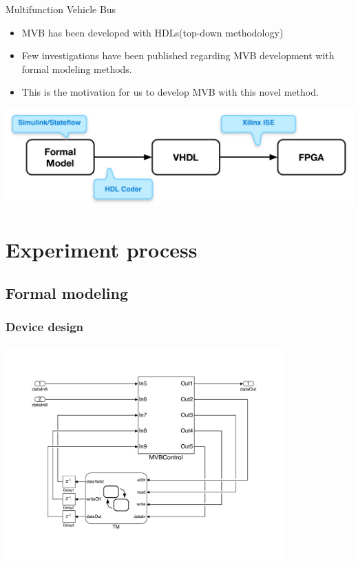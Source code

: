 \documentclass[12pt,beamer]{beamer}
\begin{document}
\begin{frame}{Multifunction Vehicle Bus}

\begin{itemize}
	\setlength{\itemsep}{10pt}
	\item MVB has been developed with HDLs(top-down methodology)
	\item Few investigations have been published regarding MVB development with formal modeling methods. 
	\item This is the motivation for us to develop MVB with this novel method.
\end{itemize}

\vspace{1em}
\includegraphics[width=\textwidth]{pic/Study_Process.pdf}
\end{frame}

\section{Experiment process}


\subsection{Formal modeling}

\begin{frame}
\frametitle{Device design}
\begin{center}
	\includegraphics[width=0.8\textwidth]{pic/Device_design.pdf}
\end{center}
\end{frame}
\end{document}
